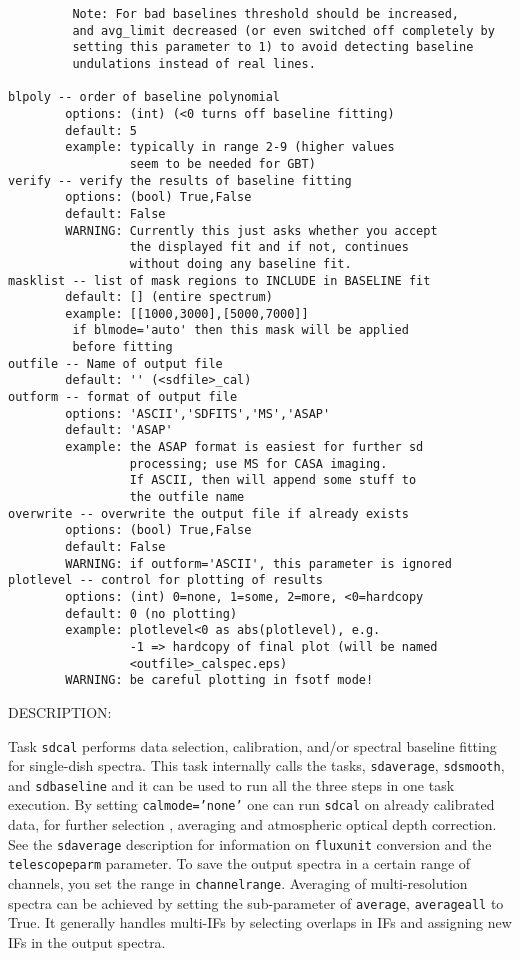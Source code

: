 \begin{verbatim}
         Note: For bad baselines threshold should be increased,
         and avg_limit decreased (or even switched off completely by
         setting this parameter to 1) to avoid detecting baseline
         undulations instead of real lines.

blpoly -- order of baseline polynomial
        options: (int) (<0 turns off baseline fitting)
        default: 5
        example: typically in range 2-9 (higher values
                 seem to be needed for GBT)
verify -- verify the results of baseline fitting
        options: (bool) True,False
        default: False
        WARNING: Currently this just asks whether you accept
                 the displayed fit and if not, continues
                 without doing any baseline fit.
masklist -- list of mask regions to INCLUDE in BASELINE fit
        default: [] (entire spectrum)
        example: [[1000,3000],[5000,7000]]
         if blmode='auto' then this mask will be applied
         before fitting
outfile -- Name of output file
        default: '' (<sdfile>_cal)
outform -- format of output file
        options: 'ASCII','SDFITS','MS','ASAP'
        default: 'ASAP'
        example: the ASAP format is easiest for further sd
                 processing; use MS for CASA imaging.
                 If ASCII, then will append some stuff to
                 the outfile name
overwrite -- overwrite the output file if already exists
        options: (bool) True,False
        default: False
        WARNING: if outform='ASCII', this parameter is ignored
plotlevel -- control for plotting of results
        options: (int) 0=none, 1=some, 2=more, <0=hardcopy
        default: 0 (no plotting)
        example: plotlevel<0 as abs(plotlevel), e.g.
                 -1 => hardcopy of final plot (will be named
                 <outfile>_calspec.eps)
        WARNING: be careful plotting in fsotf mode!
\end{verbatim}
    
DESCRIPTION:

    Task {\tt sdcal} performs data selection, calibration, and/or spectral
    baseline fitting for single-dish spectra. This task internally calls the
    tasks, {\tt sdaverage}, {\tt sdsmooth}, and {\tt sdbaseline} and it can be used to run all the
    three steps in one task execution.
    By setting {\tt calmode='none'}
    one can run {\tt sdcal} on already calibrated data, for further selection
    , averaging and atmospheric optical depth correction.
    See the {\tt sdaverage} description for information on {\tt fluxunit} 
    conversion and the {\tt telescopeparm} parameter.
    To save the output spectra  in a certain range of 
    channels, you set the range in {\tt channelrange}. 
    Averaging of multi-resolution
    spectra can be achieved by setting the sub-parameter of {\tt average}, {\tt averageall} 
    to True. It generally handles multi-IFs by selecting overlaps in IFs and assigning
    new IFs in the output spectra. 
       
